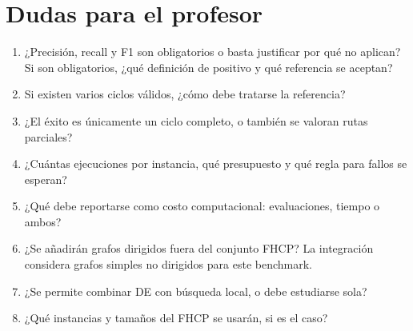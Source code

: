 \section{Dudas para el profesor}\label{de:sec:dudas}
\begin{enumerate}[leftmargin=*]
\item ¿Precisión, recall y F1 son obligatorios o basta justificar por qué no aplican? Si son obligatorios, ¿qué definición de positivo y qué referencia se aceptan?
\item Si existen varios ciclos válidos, ¿cómo debe tratarse la referencia?
\item ¿El éxito es únicamente un ciclo completo, o también se valoran rutas parciales?
\item ¿Cuántas ejecuciones por instancia, qué presupuesto y qué regla para fallos se esperan?
\item ¿Qué debe reportarse como costo computacional: evaluaciones, tiempo o ambos?
\item ¿Se añadirán grafos dirigidos fuera del conjunto FHCP? La integración considera grafos simples no dirigidos para este benchmark.
\item ¿Se permite combinar DE con búsqueda local, o debe estudiarse sola?
\item ¿Qué instancias y tamaños del FHCP se usarán, si es el caso?
\end{enumerate}

